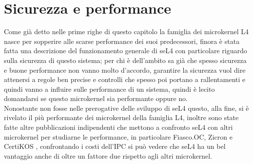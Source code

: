 \section{Sicurezza e performance}
Come già detto nelle prime righe di questo capitolo la famiglia dei microkernel L4 nasce per sopperire alle scarse performance dei suoi predecessori, finora è stata fatta una descrizione del funzionamento generale di seL4 con particolare riguardo sulla sicurezza di questo sistema; per chi è dell'ambito sa già che spesso sicurezza e buone performance non vanno molto d'accordo, garantire la sicurezza vuol dire attenersi a regole ben precise e controlli che spesso poi portano a rallentamenti e quindi vanno a influire sulle performance di un sistema, quindi è lecito domandarsi se questo microkernel sia performante oppure no.\\
Nonostante non fosse nelle prerogative delle sviluppo di seL4 questo, alla fine, si è rivelato il più performante dei microkernel della famiglia L4, inoltre sono state fatte altre pubblicazioni indipendenti che mettono a confronto seL4 con altri microkernel per studiarne le performance, in particolare Fiasco.OC, Zicron \cite{skybridge} e CertiKOS \cite{CertiKOS}, confrontando i costi dell'IPC si può vedere che seL4 ha un bel vantaggio anche di oltre un fattore due rispetto agli altri microkernel.